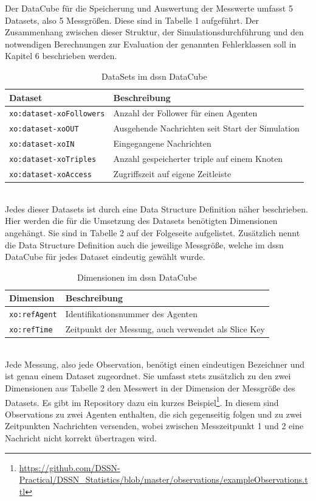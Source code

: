 \documentclass{article}
\begin{document}
Der DataCube für die Speicherung und Auswertung der Messwerte umfasst 5 Datasets, also 5 Messgrößen. Diese sind in Tabelle 1 aufgeführt. Der Zusammenhang zwischen dieser Struktur, der Simulationsdurchführung und den notwendigen Berechnungen zur Evaluation der genannten Fehlerklassen soll in Kapitel 6 beschrieben werden.\\
\begin{table}[h]
\centering
\label{table1}
\begin{tabular}{|l|l|}
\hline
Dataset & Beschreibung \\ \hline
\texttt{xo:dataset-xoFollowers}       & Anzahl der Follower für einen Agenten            	\\ \hline
\texttt{xo:dataset-xoOUT}        & Ausgehende Nachrichten seit Start der Simulation         \\ \hline
\texttt{xo:dataset-xoIN}        & Eingegangene Nachrichten             						\\ \hline
\texttt{xo:dataset-xoTriples}        & Anzahl gespeicherter triple auf einem Knoten        	\\ \hline
\texttt{xo:dataset-xoAccess}        & Zugriffszeit auf eigene Zeitleiste             		\\ \hline
\end{tabular}
\caption{DataSets im dssn DataCube}
\end{table}\\
Jedes dieser Datasets ist durch eine Data Structure Definition näher beschrieben. Hier werden die für die Umsetzung des Datasets benötigten Dimensionen angehängt. Sie sind in Tabelle 2 auf der Folgeseite aufgelistet. Zusätzlich nennt die Data Structure Definition auch die jeweilige Messgröße, welche im dssn DataCube für jedes Dataset eindeutig gewählt wurde.
\begin{table}[t]
\centering
\label{table2}
\begin{tabular}{|l|l|}
\hline
Dimension & Beschreibung \\ \hline
\texttt{xo:refAgent}       & Identifikationsnummer des Agenten            			\\ \hline
\texttt{xo:refTime}        & Zeitpunkt der Messung, auch verwendet als Slice Key	\\ \hline
\end{tabular}
\caption{Dimensionen im dssn DataCube}
\end{table}\\
Jede Messung, also jede Observation, benötigt einen eindeutigen Bezeichner und ist genau einem Dataset zugeordnet. Sie umfasst stets zusätzlich zu den zwei Dimensionen aus Tabelle 2 den Messwert in der Dimension der Messgröße des Datasets. Es gibt im Repository dazu ein kurzes Beispiel\footnote{\url{https://github.com/DSSN-Practical/DSSN_Statistics/blob/master/observations/exampleObservations.ttl}}. In diesem sind Observations zu zwei Agenten enthalten, die sich gegenseitig folgen und zu zwei Zeitpunkten Nachrichten versenden, wobei zwischen Messzeitpunkt 1 und 2 eine Nachricht nicht korrekt übertragen wird.
\end{document}
